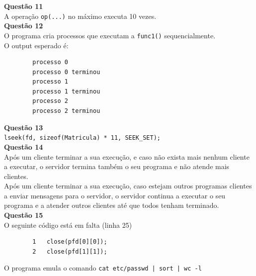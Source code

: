 \documentclass[a4paper, 11pt]{article}
\begin{document}
\newpage

\noindent \textbf{Questão 11}\\

\noindent {} A operação \texttt{op(...)} no máximo executa 10 vezes.\\


\noindent \textbf{Questão 12}\\

\noindent {} O programa cria processos que executam a \texttt{func1()} sequencialmente.\\

\noindent {} O output esperado é:
\begin{verbatim}
        processo 0
        processo 0 terminou
        processo 1
        processo 1 terminou
        processo 2
        processo 2 terminou
\end{verbatim}


\noindent \textbf{Questão 13}\\

\noindent {} \texttt{lseek(fd, sizeof(Matricula) * 11, SEEK\_SET);}\\


\noindent \textbf{Questão 14}\\

\noindent {} Após um cliente terminar a sua execução, e caso não exista mais nenhum cliente a executar, o servidor termina também o seu programa e não atende mais clientes.\\

\noindent {} Após um cliente terminar a sua execução, caso estejam outros programas clientes a enviar mensagens para o servidor, o servidor continua a executar o seu programa e a atender outros clientes até que todos tenham terminado.\\


\noindent \textbf{Questão 15}\\

\noindent {} O seguinte código está em falta (linha 25)
\begin{verbatim}
        1   close(pfd[0][0]);
        2   close(pfd[1][1]);
\end{verbatim}

\noindent {} O programa emula o comando \texttt{cat etc/passwd | sort | wc -l}
\end{document}
